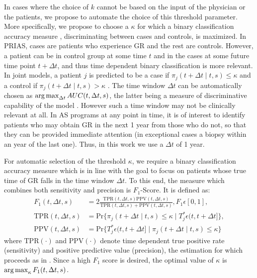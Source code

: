 In cases where the choice of $k$ cannot be based on the input of the physician or the patients, we propose to automate the choice of this threshold parameter. More specifically, we propose to choose a $\kappa$ for which a binary classification accuracy measure \citep{lopez2014optimalcutpoints,sokolova2009systematic}, discriminating between cases and controls, is maximized. In PRIAS, cases are patients who experience GR and the rest are controls. However, a patient can be in control group at some time $t$ and in the cases at some future time point $t + \Delta t$, and thus time dependent binary classification is more relevant. In joint models, a patient $j$ is predicted to be a case if $\pi_j(t + \Delta t \mid t,s) \leq \kappa$ and a control if $\pi_j(t + \Delta t \mid t,s) > \kappa$ \citep{rizopoulosJMbayes}. The time window $\Delta t$ can be automatically chosen as $\operatorname{arg\,max}_{\Delta t}AUC(t, \Delta t, s)$, the latter being a measure of discriminative capability of the model \citep{rizopoulosJMbayes}. However such a time window may not be clinically relevant at all. In AS programs at any point in time, it is of interest to identify patients who may obtain GR in the next 1 year from those who do not, so that they can be provided immediate attention (in exceptional cases a biopsy within an year of the last one). Thus, in this work we use a $\Delta t$ of 1 year.

For automatic selection of the threshold $\kappa$, we require a binary classification accuracy measure which is in line with the goal to focus on patients whose true time of GR falls in the time window $\Delta t$. To this end, the measure which combines both sensitivity and precision is $F_1$-Score. It is defined as:
\begin{align*}
F_1(t, \Delta t, s) &= 2\frac{\mbox{TPR}(t, \Delta t, s) \mbox{PPV}(t, \Delta t, s)}{\mbox{TPR}(t, \Delta t, s) + \mbox{PPV}(t, \Delta t, s)}, F_1 \epsilon [0,1],\\
\mbox{TPR}(t, \Delta t, s) &= \mbox{Pr}\big\{\pi_j(t + \Delta t \mid t,s) \leq \kappa \mid T^*_j \epsilon (t, t + \Delta t]\big\},\\
\mbox{PPV}(t, \Delta t, s) &= \mbox{Pr}\big\{T^*_j \epsilon (t, t + \Delta t] \mid \pi_j(t + \Delta t \mid t,s) \leq \kappa \big\}
\end{align*}
where $\mbox{TPR}(\cdot)$ and $\mbox{PPV}(\cdot)$ denote time dependent true positive rate (sensitivity) and positive predictive value (precision), the estimation for which proceeds as in \citet{rizopoulosJMbayes}. Since a high $F_1$ score is desired, the optimal value of $\kappa$ is $\operatorname{arg\,max}_{\kappa} F_1(t, \Delta t, s)$.